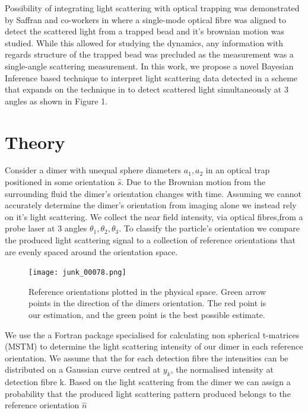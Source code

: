 \documentclass[final,3p, twocolumn]{elsarticle}
\begin{document}
Possibility of integrating light scattering with optical trapping was demonstrated by Saffran and 
co-workers in \cite{Bar-Ziv_1998} where a single-mode optical fibre was aligned to detect the scattered light from a trapped bead and it's brownian motion was studied. While this allowed for studying the dynamics, any information with regards structure of the trapped bead was precluded as the measurement was a single-angle scattering measurement.
In this work, we propose a novel Bayesian Inference based technique to interpret light scattering data detected in a scheme that expands on the technique in \cite{Bar-Ziv_1998} to detect scattered light simultaneously at 3 angles as shown in Figure 1.  

\section{Theory}
\label{2}

Consider a dimer with unequal sphere diameters $a_1, a_2$ in an optical trap positioned in some orientation $\hat{s}$. Due to the Brownian motion from the surrounding fluid the dimer's orientation changes with time. Assuming we cannot accurately determine the dimer's orientation from imaging alone we instead rely on it's light scattering. We collect the near field intensity, via optical fibres,from a probe laser at 3 angles $\theta_1, \theta_2, \theta_3$. To classify the particle's orientation we compare the produced light scattering signal to a collection of reference orientations that are evenly spaced around the orientation space.

\begin{figure}[t]
	\centering
	\texttt{[image: junk\_00078.png]}
	\caption{Reference orientations plotted in the physical space. Green arrow points in the direction of the dimers orientation. The red point is our estimation, and the green point is the best possible estimate.}
\end{figure}

We use the a Fortran package specialised for calculating non spherical t-matrices (MSTM) \cite{Mishchenko1996MSTM} to determine the light scattering intensity of our dimer in each reference orientation. We assume that the for each detection fibre the intensities can be distributed on a Gaussian curve centred at $y_k$, the normalised intensity at detection fibre k. Based on the light scattering from the dimer we can assign a probability that the produced light scattering pattern produced belongs to the reference orientation $\hat{n}$
\end{document}

